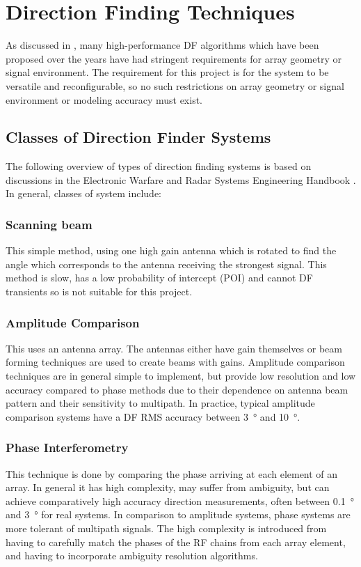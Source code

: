 \section{Direction Finding Techniques}

As discussed in \cite{farrier1990direction}, many high-performance DF algorithms which have been proposed over the years have had stringent requirements for array geometry or signal environment. The requirement for this project is for the system to be versatile and reconfigurable, so no such restrictions on array geometry or signal environment or modeling accuracy must exist. 

\subsection{Classes of Direction Finder Systems}
The following overview of types of direction finding systems is based on discussions in the Electronic Warfare and Radar Systems Engineering Handbook \cite{desk1997electronic}.
In general, classes of system include:
\subsubsection{Scanning beam}
This simple method, using one high gain antenna which is rotated to find the angle which corresponds to the antenna receiving the strongest signal. This method is slow, has a low probability of intercept (POI) and cannot DF transients so is not suitable for this project.
\subsubsection{Amplitude Comparison}
This uses an antenna array. The antennas either have gain themselves or beam forming techniques are used to create beams with gains. Amplitude comparison techniques are in general simple to implement, but provide low resolution and low accuracy compared to phase methods due to their dependence on antenna beam pattern and their sensitivity to multipath. In practice, typical amplitude comparison systems have a DF RMS accuracy between \SI{3}{\degree} and \SI{10}{\degree}.
\subsubsection{Phase Interferometry}
This technique is done by comparing the phase arriving at each element of an array. In general it has high complexity, may suffer from ambiguity, but can achieve comparatively high accuracy direction measurements, often between \SI{0.1}{\degree} and \SI{3}{\degree} for real systems. In comparison to amplitude systems, phase systems are more tolerant of multipath signals. The high complexity is introduced from having to carefully match the phases of the RF chains from each array element, and having to incorporate ambiguity resolution algorithms. 

